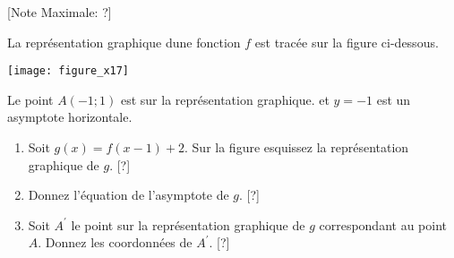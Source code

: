 \begin{question}
  \hspace*{\fill} [Note Maximale: ?]\par
  \begin{center} %
    \noindent La représentation graphique dune fonction $f$ est tracée sur la figure ci-dessous.\par
    \texttt{[image: figure\_x17]}\par
    \noindent Le point $A(-1; 1)$ est sur la représentation graphique. et $y=-1$ est un asymptote horizontale.\par
  \end{center} %
  \begin{enumerate}[label=(\alph*)]
    \item Soit $g(x) = f(x-1) + 2$. Sur la figure esquissez la représentation graphique de $g$.\hspace*{\fill} [?]
    \item Donnez l'équation de l'asymptote de $g$.\hspace*{\fill} [?]
    \item Soit $A^\prime$ le point sur la représentation graphique de $g$ correspondant au point $A$.  Donnez les coordonnées de $A^\prime$.\hspace*{\fill} [?]
  \end{enumerate}
\end{question}

